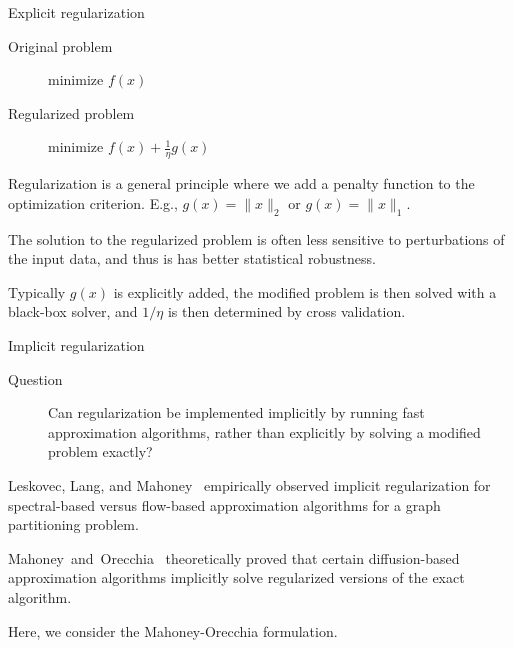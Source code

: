 \documentclass[xcolor=dvipsnames]{beamer}
\begin{document}
\begin{frame}
  \begin{block}{Explicit regularization}
  \begin{description}
    \item[Original problem] minimize $f(x)$
    \item[Regularized problem] minimize $f(x) + \frac{1}{\eta} g(x)$
  \end{description}
  \end{block}

  Regularization is a general principle where we add a penalty function to
  the optimization criterion.  E.g., $g(x) = \|x\|_2$ or $g(x) = \|x\|_1$.

  The solution to the regularized problem is often less sensitive to 
  perturbations of the input data, and thus is has better statistical 
  robustness.
  
  Typically $g(x)$ is explicitly added, the modified problem is then
  solved with a black-box solver, and $1/\eta$ is then determined by cross 
  validation.
\end{frame}


\begin{frame}
  \begin{block}{Implicit regularization}
  \begin{description}
    \item[Question] Can regularization be implemented implicitly by running
                    fast approximation algorithms, rather than explicitly by
                    solving a modified problem exactly?
  \end{description}
  \end{block}

Leskovec, Lang, and Mahoney~\cite{LLM10_communities_CONF} empirically 
observed implicit regularization for spectral-based versus flow-based 
approximation algorithms for a graph partitioning problem.

Mahoney~and~Orecchia~\cite{MO11-implementing} theoretically proved that 
certain diffusion-based approximation algorithms implicitly solve regularized 
versions of the exact algorithm.

Here, we consider the Mahoney-Orecchia formulation.

\end{frame}
\end{document}
